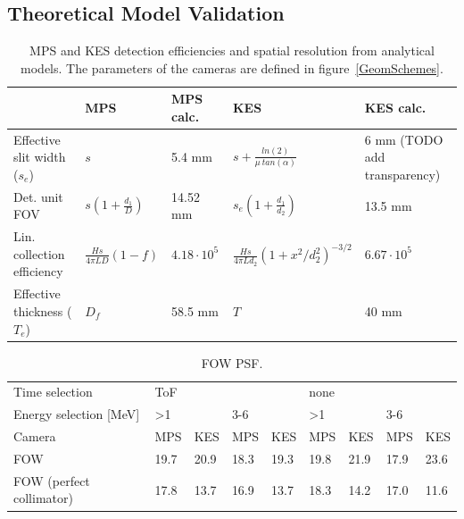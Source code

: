 \documentclass[a4paper,english]{article}
\begin{document}
\subsection{Theoretical Model Validation}

\begin{table}
\centering
\begin{tabular}{lllll}
	\midrule
	                            & MPS & MPS calc. & KES & KES calc. \\
	\midrule
	Effective slit width ($s_e$)& $s$                              & 5.4 mm
	 & $s + \frac{ln(2)}{\mu~tan(\alpha)}$                         & 6 mm (TODO add transparency) \\
 	Det. unit FOV               & $s(1+\frac{d_1}{D})$             & 14.52 mm
 	 & $s_e(1+\frac{d_1}{d_2})$                                    & 13.5 mm\\
 	Lin. collection efficiency  & $\frac{H s}{ 4 \pi L D } (1-f) $ & $4.18 \cdot 10^5$
 	 & $\frac{H s}{ 4 \pi L d_2 } (1 + x^2/d^2_2)^{-3/2} $         & $6.67 \cdot 10^5$ \\
 	Effective thickness ($T_e$) & $D_f$                            & 58.5 mm
 	 & $T$                                                         & 40 mm\\
	\midrule
\end{tabular}
\caption{MPS and KES detection efficiencies and spatial resolution from analytical models. The parameters of the cameras are defined in figure~\ref{GeomSchemes}.}
\label{GeomFormulas}
\end{table}


\begin{table}
\centering
\begin{tabular}{lllllllll}
	\midrule
	Time selection 					& ToF &     &     &     & none&     &     &     \\
	Energy selection [MeV]			& >1   &     & 3-6 &     & >1   &     & 3-6 &     \\
	Camera 							& MPS & KES & MPS & KES & MPS & KES & MPS & KES \\
	\midrule
 	FOW                         	& 19.7& 20.9& 18.3& 19.3& 19.8& 21.9& 17.9& 23.6\\
 	FOW (perfect collimator) 	& 17.8& 13.7& 16.9& 13.7& 18.3& 14.2& 17.0& 11.6\\
	\midrule
\end{tabular}
\caption{FOW PSF.}
\label{FOWCOMP}
\end{table}
\end{document}
